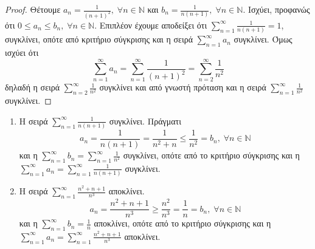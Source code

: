 \documentclass[a4paper,table]{report}
\begin{document}
\begin{proof}
\item {}
    Θέτουμε $ a_{n} = \frac{1}{(n+1)^{2}}, \; \forall n \in \mathbb{N} $ και 
    $ b_{n} = \frac{1}{n(n+1)}, \; \forall n \in \mathbb{N} $. Ισχύει, προφανώς ότι
    $ 0 \leq a_{n} \leq b_{n}, \; \forall n \in \mathbb{N} $. Επιπλέον έχουμε αποδείξει
    ότι $ \sum_{n=1}^{\infty} \frac{1}{n(n+1)} = 1 $, συγκλίνει, οπότε από κριτήριο 
    σύγκρισης και η σειρά 
    $ \sum_{n=1}^{\infty} a_{n} $ συγκλίνει. Όμως ισχύει ότι
    \[
        \sum_{n=1}^{\infty} a_{n} = \sum_{n=1}^{\infty} \frac{1}{(n+1)^{2}} = 
        \sum_{n=2}^{\infty} \frac{1}{n^{2}} 
    \] 
    δηλαδή η σειρά $ \sum_{n=2}^{\infty} \frac{1}{n^{2}} $ συγκλίνει και από γνωστή 
    πρόταση και η σειρά $ \sum_{n=1}^{\infty} \frac{1}{n^{2}} $ συγκλίνει.
\end{proof}

\begin{examples}
\item {}
    \begin{enumerate}
        \item Η σειρά $ \sum_{n=1}^{\infty} \frac{1}{n(n+1)} $ συγκλίνει. Πράγματι
            \[
                a_{n}= \frac{1}{n(n+1)} = \frac{1}{n^{2}+n} \leq \frac{1}{n^{2}} = 
                b_{n}, \; \forall n \in \mathbb{N}
            \] 
            και η $ \sum_{n=1}^{\infty} b_{n} = \sum_{n=1}^{\infty} \frac{1}{n^{2}} $ 
            συγκλίνει, οπότε από το κριτήριο 
            σύγκρισης και η $ \sum_{n=1}^{\infty} a_{n} = \sum_{n=1}^{\infty} 
            \frac{1}{n(n+1)} $ συγκλίνει. 

        \item Η σειρά $ \sum_{n=1}^{\infty} \frac{n^{2}+n+1}{n^{3}} $ αποκλίνει. 
            \[
                a_{n} = \frac{n^{2}+n+1}{n^{3}} \geq \frac{n^{2}}{n^{3}} = \frac{1}{n} 
                = b_{n}, \; \forall n \in \mathbb{N} 
            \] 
            και η $ \sum_{n=1}^{\infty} b_{n} = \frac{1}{n} $ αποκλίνει, οπότε από 
            το κριτήριο σύγκρισης και η $ \sum_{n=1}^{\infty} a_{n} = 
            \sum_{n=1}^{\infty} \frac{n^{2}+n+1}{n^{3}} $ αποκλίνει.
    \end{enumerate}
\end{examples}
\end{document}
